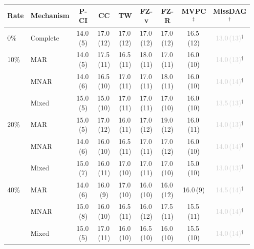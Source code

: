 \begin{tabular}{llccccccc}
    \toprule
    Rate & Mechanism & P-CI & CC & TW & FZ-v & FZ-R & MVPC$^\ddagger$ & MissDAG$^\dagger$ \\
    \midrule
    0\% & Complete & 14.0\,{\scriptsize(5)} & 17.0\,{\scriptsize(12)} & 17.0\,{\scriptsize(12)} & 17.0\,{\scriptsize(12)} & 17.0\,{\scriptsize(12)} & 16.5\,{\scriptsize(12)} & \textcolor{lightgray}{13.0\,{\scriptsize(13)}}$^\dagger$ \\
    \midrule
    10\% & MAR   & 14.0\,{\scriptsize(5)} & 17.5\,{\scriptsize(11)} & 16.5\,{\scriptsize(11)} & 18.0\,{\scriptsize(11)} & 17.0\,{\scriptsize(11)} & 16.0\,{\scriptsize(10)} & \textcolor{lightgray}{14.0\,{\scriptsize(13)}}$^\dagger$ \\
         & MNAR  & 14.0\,{\scriptsize(6)} & 16.5\,{\scriptsize(10)} & 17.0\,{\scriptsize(11)} & 17.0\,{\scriptsize(11)} & 18.0\,{\scriptsize(11)} & 16.0\,{\scriptsize(10)} & \textcolor{lightgray}{14.0\,{\scriptsize(14)}}$^\dagger$ \\
         & Mixed & 15.0\,{\scriptsize(5)} & 15.0\,{\scriptsize(10)} & 17.0\,{\scriptsize(11)} & 17.0\,{\scriptsize(11)} & 17.0\,{\scriptsize(10)} & 16.0\,{\scriptsize(10)} & \textcolor{lightgray}{13.5\,{\scriptsize(13)}}$^\dagger$ \\
    \midrule
    20\% & MAR   & 15.0\,{\scriptsize(5)} & 17.0\,{\scriptsize(12)} & 16.0\,{\scriptsize(11)} & 17.0\,{\scriptsize(12)} & 19.0\,{\scriptsize(12)} & 16.0\,{\scriptsize(11)} & \textcolor{lightgray}{14.0\,{\scriptsize(13)}}$^\dagger$ \\
         & MNAR  & 14.0\,{\scriptsize(6)} & 16.0\,{\scriptsize(10)} & 16.5\,{\scriptsize(11)} & 17.0\,{\scriptsize(11)} & 17.0\,{\scriptsize(12)} & 16.0\,{\scriptsize(10)} & \textcolor{lightgray}{14.0\,{\scriptsize(14)}}$^\dagger$ \\
         & Mixed & 15.0\,{\scriptsize(7)} & 16.0\,{\scriptsize(11)} & 17.0\,{\scriptsize(10)} & 17.0\,{\scriptsize(11)} & 17.0\,{\scriptsize(10)} & 15.0\,{\scriptsize(10)} & \textcolor{lightgray}{13.0\,{\scriptsize(13)}}$^\dagger$ \\
    \midrule
    40\% & MAR   & 14.0\,{\scriptsize(6)} & 16.0\,{\scriptsize(9)} & 17.0\,{\scriptsize(10)} & 16.0\,{\scriptsize(10)} & 16.0\,{\scriptsize(12)} & 16.0\,{\scriptsize(9)} & \textcolor{lightgray}{14.5\,{\scriptsize(14)}}$^\dagger$ \\
         & MNAR  & 15.0\,{\scriptsize(8)} & 16.0\,{\scriptsize(10)} & 16.5\,{\scriptsize(11)} & 16.0\,{\scriptsize(12)} & 17.5\,{\scriptsize(11)} & 15.5\,{\scriptsize(11)} & \textcolor{lightgray}{14.0\,{\scriptsize(14)}}$^\dagger$ \\
         & Mixed & 15.0\,{\scriptsize(5)} & 17.0\,{\scriptsize(11)} & 16.0\,{\scriptsize(10)} & 16.5\,{\scriptsize(10)} & 16.0\,{\scriptsize(10)} & 15.5\,{\scriptsize(10)} & \textcolor{lightgray}{14.0\,{\scriptsize(14)}}$^\dagger$ \\
    \bottomrule
\end{tabular}
